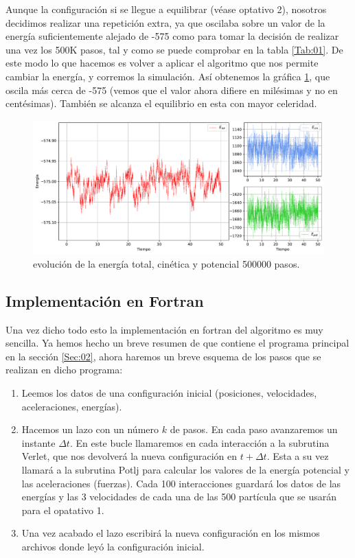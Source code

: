 \documentclass[11pt]{article} %
\begin{document}
Aunque la configuración si se llegue a equilibrar (véase optativo 2), nosotros decidimos realizar una repetición extra, ya que oscilaba sobre un valor de la energía suficientemente alejado de -575 como para tomar la decisión de realizar una vez los 500K pasos, tal y como se puede comprobar en la tabla \ref{Tab:01}. De este modo lo que hacemos es volver a aplicar el algoritmo que nos permite cambiar la energía, y corremos la simulación. Así obtenemos la gráfica \ref{Fig:03}, que oscila más cerca de -575 (vemos que el valor ahora difiere en milésimas y no en centésimas). También se alcanza el equilibrio en esta con mayor celeridad.

\begin{figure}[h!] \centering
	\includegraphics[width=1.0\textwidth]{../../Graficas/Et-equilibra-500K-2.pdf}
	\caption{evolución de la energía total, cinética y potencial 500000 pasos.}
	\label{Fig:03}
\end{figure}	

\subsection{Implementación en Fortran}

Una vez dicho todo esto la implementación en fortran del algoritmo es muy sencilla. Ya hemos hecho un breve resumen de que contiene el programa principal en la sección \ref{Sec:02}, ahora haremos un breve esquema de los pasos que se realizan en dicho programa:

\begin{enumerate}
\item Leemos los datos de una configuración inicial (posiciones, velocidades, aceleraciones, energías).
\item Hacemos un lazo con un número $k$ de pasos. En cada paso avanzaremos un instante $\Delta t$. En este bucle llamaremos en cada interacción a la subrutina Verlet, que nos devolverá la nueva configuración en $t+\Delta t$. Esta a su vez llamará a la subrutina Potlj para calcular los valores de la energía potencial y las aceleraciones (fuerzas). Cada 100 interacciones guardará los datos de las energías y las 3 velocidades de cada una de las 500 partícula que se usarán para el opatativo 1.
\item Una vez acabado el lazo escribirá la nueva configuración en los mismos archivos donde leyó la configuración inicial.
\end{enumerate}
\end{document}
